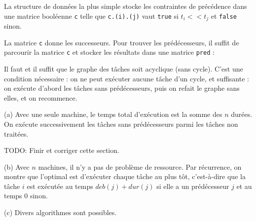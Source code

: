 \Corrige

\Q
La structure de données la plus simple stocke les contraintes de précédence dans une matrice booléenne \texttt{c} telle que \texttt{c.(i).(j)} vaut \texttt{true} si $t_i << t_j$ et \texttt{false} sinon.
\medskip

La matrice \texttt{c} donne les successeurs. Pour trouver les prédécesseurs, il suffit de parcourir la matrice \texttt{c} et stocker les résultats dans une matrice \texttt{pred} :



\Q
Il faut et il suffit que le graphe des tâches soit acyclique (sans cycle). C'est une condition nécessaire : on ne peut exécuter aucune tâche d'un cycle, et suffisante : on exécute d'abord les tâches sans prédécesseurs, puis on refait le graphe sans elles, et on recommence.

\Q
(a) Avec une seule machine, le temps total d'exécution est la somme des $n$ durées. On exécute successivement les tâches sans prédécesseurs parmi les tâches non traitées.



TODO: Finir et corriger cette section.

(b) Avec $n$ machines, il n'y a pas de problème de ressource. Par récurrence, on montre que l'optimal est d'exécuter chaque tâche au plus tôt, c'est-à-dire que la tâche $i$ est exécutée au temps $deb(j) + dur(j)$ si elle a un prédécesseur $j$ et au temps 0 sinon.
\medskip

(c) Divers algorithmes sont possibles.
\bigskip

\Fin
